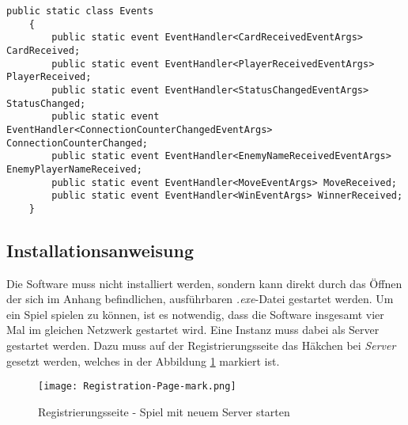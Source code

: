 \begin{lstlisting}[label=code:client-events, caption={Codeauschnitt Client Events}]
	public static class Events
	{
		public static event EventHandler<CardReceivedEventArgs> CardReceived;
		public static event EventHandler<PlayerReceivedEventArgs> PlayerReceived;
		public static event EventHandler<StatusChangedEventArgs> StatusChanged;
		public static event EventHandler<ConnectionCounterChangedEventArgs> ConnectionCounterChanged;
		public static event EventHandler<EnemyNameReceivedEventArgs> EnemyPlayerNameReceived;
		public static event EventHandler<MoveEventArgs> MoveReceived;
		public static event EventHandler<WinEventArgs> WinnerReceived;
	}	
\end{lstlisting}
\subsection{Installationsanweisung}
Die Software muss nicht installiert werden, sondern kann direkt durch das Öffnen der sich im Anhang befindlichen, ausführbaren \textit{.exe}-Datei gestartet werden. Um ein Spiel spielen zu können, ist es notwendig, dass die Software insgesamt vier Mal im gleichen Netzwerk gestartet wird. Eine Instanz muss dabei als Server gestartet werden. Dazu muss auf der Registrierungsseite das Häkchen bei \textit{Server} gesetzt werden, welches in der Abbildung \ref{fig:regipage-mark} markiert ist.
\begin{figure}[h]
	\begin{center}
		\texttt{[image: Registration-Page-mark.png]}
		\caption{Registrierungsseite - Spiel mit neuem Server starten}
		\label{fig:regipage-mark}
	\end{center}
\end{figure}